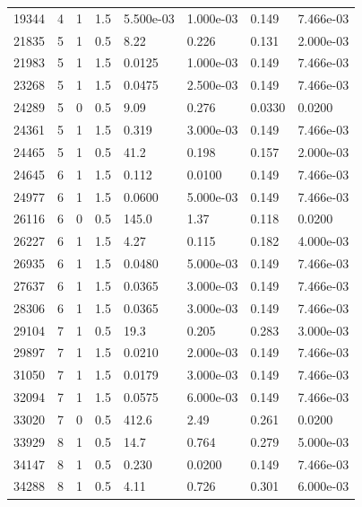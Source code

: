 \documentclass[preview]{standalone}
\begin{document}
{{\begin{tabular}{L{1.2cm}C{1.2cm} C{0.3cm}C{0.5cm} C{1.4cm}C{1.4cm} C{1.4cm}C{1.4cm}}
  19344  &     4  & 1     & 1.5 &  5.500e-03  & 1.000e-03  & 0.149 &  7.466e-03   \\ 
  21835  &     5  & 1     & 0.5 &  8.22  & 0.226  & 0.131 &  2.000e-03   \\ 
  21983  &     5  & 1     & 1.5 &  0.0125  & 1.000e-03  & 0.149 &  7.466e-03   \\ 
  23268  &     5  & 1     & 1.5 &  0.0475  & 2.500e-03  & 0.149 &  7.466e-03   \\ 
  24289  &     5  & 0     & 0.5 &  9.09  & 0.276  & 0.0330 &  0.0200   \\ 
  24361  &     5  & 1     & 1.5 &  0.319  & 3.000e-03  & 0.149 &  7.466e-03   \\ 
  24465  &     5  & 1     & 0.5 &  41.2  & 0.198  & 0.157 &  2.000e-03   \\ 
  24645  &     6  & 1     & 1.5 &  0.112  & 0.0100  & 0.149 &  7.466e-03   \\ 
  24977  &     6  & 1     & 1.5 &  0.0600  & 5.000e-03  & 0.149 &  7.466e-03   \\ 
  26116  &     6  & 0     & 0.5 &  145.0  & 1.37  & 0.118 &  0.0200   \\ 
  26227  &     6  & 1     & 1.5 &  4.27  & 0.115  & 0.182 &  4.000e-03   \\ 
  26935  &     6  & 1     & 1.5 &  0.0480  & 5.000e-03  & 0.149 &  7.466e-03   \\ 
  27637  &     6  & 1     & 1.5 &  0.0365  & 3.000e-03  & 0.149 &  7.466e-03   \\ 
  28306  &     6  & 1     & 1.5 &  0.0365  & 3.000e-03  & 0.149 &  7.466e-03   \\ 
  29104  &     7  & 1     & 0.5 &  19.3  & 0.205  & 0.283 &  3.000e-03   \\ 
  29897  &     7  & 1     & 1.5 &  0.0210  & 2.000e-03  & 0.149 &  7.466e-03   \\ 
  31050  &     7  & 1     & 1.5 &  0.0179  & 3.000e-03  & 0.149 &  7.466e-03   \\ 
  32094  &     7  & 1     & 1.5 &  0.0575  & 6.000e-03  & 0.149 &  7.466e-03   \\ 
  33020  &     7  & 0     & 0.5 &  412.6  & 2.49  & 0.261 &  0.0200   \\ 
  33929  &     8  & 1     & 0.5 &  14.7  & 0.764  & 0.279 &  5.000e-03   \\ 
  34147  &     8  & 1     & 0.5 &  0.230  & 0.0200  & 0.149 &  7.466e-03   \\ 
  34288  &     8  & 1     & 0.5 &  4.11  & 0.726  & 0.301 &  6.000e-03   \\ 

\end{tabular}}}
\end{document}
